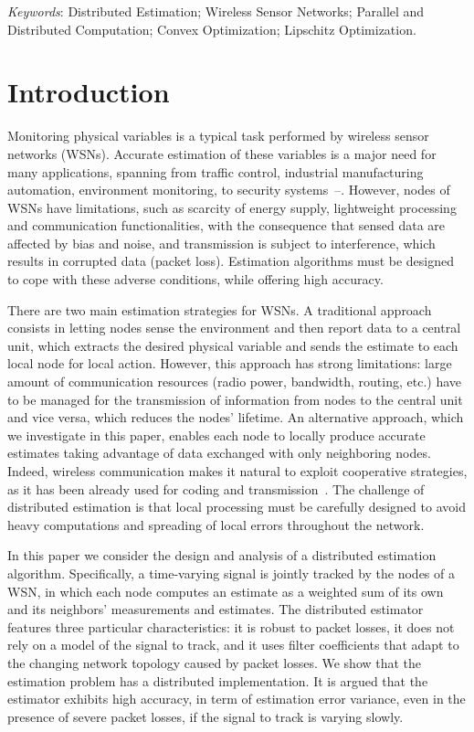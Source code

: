 \documentclass[a4paper,notitlepage,onecolumn]{article}
\numberwithin{equation}{section}
\begin{document}
\begin{center}
\emph{Keywords}: Distributed Estimation; Wireless Sensor Networks; Parallel and Distributed Computation; Convex Optimization; Lipschitz Optimization.
\end{center}



\section{Introduction}
\label{sec:introduction}

Monitoring physical variables is a typical task performed by
wireless sensor networks (WSNs). Accurate estimation of these
variables is a major need for many applications, spanning from
traffic control, industrial manufacturing automation, environment
monitoring, to security
systems~\cite{EGH99}--\nocite{GK03}\cite{SIDSP06}. However, nodes
of WSNs have limitations, such as scarcity of energy supply, lightweight
processing and communication functionalities, with the
consequence that sensed data are affected by bias and noise, and
transmission is subject to interference, which results in
corrupted data (packet loss). Estimation algorithms must be
designed to cope with these adverse conditions, while offering
high accuracy.

There are two main estimation strategies for WSNs. A traditional
approach consists in letting nodes sense the environment and then
report data to a central unit, which extracts the desired physical
variable and sends the estimate to each local node for local
action. However, this approach has strong limitations: large
amount of communication resources (radio power, bandwidth,
routing, etc.) have to be managed for the transmission of
information from nodes to the central unit and vice versa, which
reduces the nodes' lifetime. An alternative approach, which we
investigate in this paper, enables each node to locally produce
accurate estimates taking advantage of data exchanged with only
neighboring nodes. Indeed, wireless communication makes it natural
to exploit cooperative strategies, as it has been already used for
coding and transmission~\cite{SIDSP06,JSAC06}. The challenge of
distributed estimation is that local processing must be carefully
designed to avoid heavy computations and spreading of local errors
throughout the network.

In this paper we consider the design and analysis of a distributed
estimation algorithm. Specifically, a time-varying signal is
jointly tracked by the nodes of a WSN, in which each node computes
an estimate as a weighted sum of its own and its neighbors'
measurements and estimates. The distributed estimator features
three particular characteristics: it is robust to packet losses,
it does not rely on a model of the signal to track, and it uses
filter coefficients that adapt to the changing network topology
caused by packet losses. We show that the estimation problem has a
distributed implementation. It is argued that the estimator
exhibits high accuracy, in term of estimation error variance, even
in the presence of severe packet losses, if the signal to track is
varying slowly.
\end{document}
